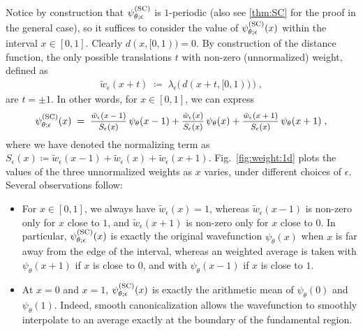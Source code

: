 Notice by construction that $\psi^{(\rm SC)}_{\theta;\epsilon}$ is $1$-periodic (also see \cref{thm:SC} for the proof in the general case), so it suffices to consider the value of $\psi^{(\rm SC)}_{\theta;\epsilon}(x)$ within the interval $x \in [0,1]$. Clearly $d(x,[0,1)) = 0$. By construction of the distance function, the only possible translations $t$ with non-zero (unnormalized) weight, defined as
\begin{align*}
    \tilde w_\epsilon(x+t) \;\coloneqq\; \lambda_\epsilon \big( \, d(x+t, [0,1)) \, \big)\;,
\end{align*}
are $t = \pm 1$. In other words, for $x \in [0,1]$, we can express 
\begin{align*}
    \psiSC_{\theta;\epsilon}(x) 
    \;=\; 
    \mfrac{\tilde w_\epsilon(x-1)}{S_\epsilon(x)}
    \, \psi_\theta(x-1)
    +
    \mfrac{\tilde w_\epsilon(x)}{S_\epsilon(x)}
    \, \psi_\theta(x)
    +
    \mfrac{\tilde w_\epsilon(x+1)}{S_\epsilon(x)}
    \, \psi_\theta(x+1)
    \;,
\end{align*}
where we have denoted the normalizing term as $S_\epsilon(x) \coloneqq \tilde w_\epsilon(x-1) + \tilde w_\epsilon(x) + \tilde w_\epsilon(x+1)$. Fig.~\ref{fig:weight:1d} plots the values of the three unnormalized weights as $x$ varies, under different choices of $\epsilon$. Several observations follow:
\begin{itemize}
    \item For $x \in [0,1]$, we always have $\tilde w_\epsilon(x) = 1$, whereas $\tilde w_\epsilon(x-1)$ is non-zero only for $x$ close to $1$, and $\tilde w_\epsilon(x+1)$ is non-zero only for $x$ close to $0$. In particular, $\psi^{(\rm SC)}_{\theta;\epsilon}(x)$ is exactly the original wavefunction $\psi_\theta(x)$ when $x$ is far away from the edge of the interval, whereas an weighted average is taken with $\psi_\theta(x+1)$ if $x$ is close to $0$, and with  $\psi_\theta(x-1)$ if $x$ is close to $1$.
    \item At $x=0$ and $x=1$, $\psi^{(\rm SC)}_{\theta;\epsilon}(x)$ is exactly the arithmetic mean of $\psi_\theta(0)$ and $\psi_\theta(1)$. Indeed, smooth canonicalization allows the wavefunction to smoothly interpolate to an average exactly at the boundary of the fundamental region.
\end{itemize}

